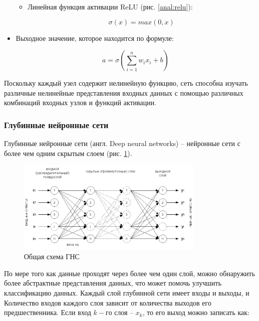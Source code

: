 \begin{itemize}
\begin{itemize}
		\item Линейная функция активации ReLU (рис. \ref{anal:relu}):
		
		\begin{equation}
		\sigma(x) = max(0, x)
		\end{equation}
		
		
	\end{itemize}
	\item Выходное значение, которое находится по формуле:
	
	\begin{equation}
	a = \sigma( \sum_{i=1}^{n}w_ix_i + b )
	\end{equation}
	
\end{itemize}

Поскольку каждый узел содержит нелинейную функцию, сеть способна изучать различные нелинейные представления входных данных с помощью различных комбинаций входных узлов и функций активации.

\subsubsection{Глубинные нейронные сети}

Глубинные нейронные сети (англ. Deep neural networks) -- нейронные сети с более чем одним скрытым слоем (рис. \ref{anal:DNN}).

\begin{figure}
	\centering
	\includegraphics[width=0.8\textwidth]{inc/img/dnn.png}
	\caption{Общая схема ГНС}
	\label{anal:DNN}
\end{figure}

По мере того как данные проходят через более чем один слой, можно обнаружить более абстрактные представления данных, что может помочь улучшить классификацию данных. Каждый слой глубинной сети имеет входы и выходы, и Количество входов каждого слоя зависит от количества выходов его предшественника. Если вход $k-го$ слоя -- $x_k$, то его выход можно записать как:

